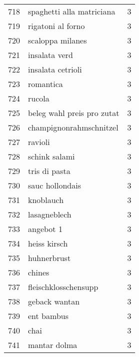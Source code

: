 \begin{tabular}{llr}
718  &                          spaghetti alla matriciana &      3 \\
719  &                                  rigatoni al forno &      3 \\
720  &                                   scaloppa milanes &      3 \\
721  &                                      insalata verd &      3 \\
722  &                                  insalata cetrioli &      3 \\
723  &                                          romantica &      3 \\
724  &                                             rucola &      3 \\
725  &                         beleg wahl preis pro zutat &      3 \\
726  &                            champignonrahmschnitzel &      3 \\
727  &                                            ravioli &      3 \\
728  &                                      schink salami &      3 \\
729  &                                      tris di pasta &      3 \\
730  &                                    sauc hollondais &      3 \\
731  &                                          knoblauch &      3 \\
732  &                                       lasagneblech &      3 \\
733  &                                          angebot 1 &      3 \\
734  &                                       heiss kirsch &      3 \\
735  &                                        huhnerbrust &      3 \\
736  &                                             chines &      3 \\
737  &                               fleischklosschensupp &      3 \\
738  &                                      geback wantan &      3 \\
739  &                                         ent bambus &      3 \\
740  &                                               chai &      3 \\
741  &                                       mantar dolma &      3 \\

\end{tabular}
